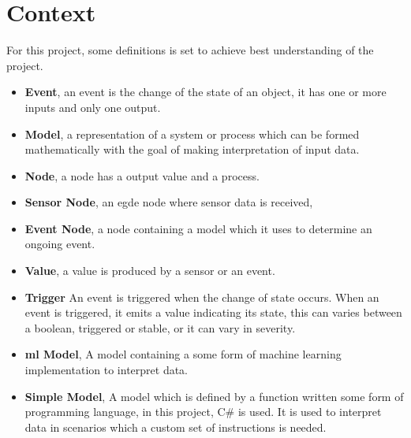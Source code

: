 \section{Context}
For this project, some definitions is set to achieve best understanding of the project.
\begin{itemize}
	\item \textbf{Event}, an event is the change of the state of an object, it has one or more inputs and  only one output.
	\item \textbf{Model}, a representation of a system or process which can be formed mathematically with the goal of making interpretation of input data.%
	\item \textbf{Node}, a node has a output value and a process.
	\item \textbf{Sensor Node}, an egde node where sensor data is received,
	\item \textbf{Event Node}, a node containing a model which it uses to determine an ongoing event.
	\item \textbf{Value}, a value is produced by a sensor or an event.
	\item \textbf{Trigger} An event is triggered when the change of state occurs. When an event is triggered, it emits a value indicating its state, this can varies between a boolean, triggered or stable, or it can vary in severity.
	\item \textbf{\gls{ml} Model}, A model containing a some form of machine learning implementation to interpret data. 
	\item \textbf{Simple Model}, A model which is defined by a function written some form of programming language, in this project, C\# is used. It is used to interpret data in scenarios which a custom set of instructions is needed.
\end{itemize}

